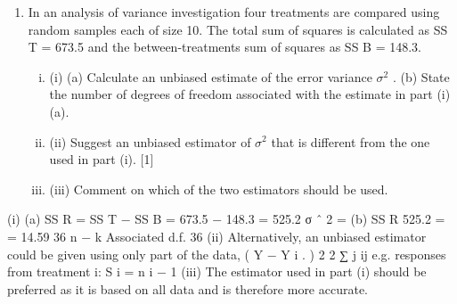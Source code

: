 \documentclass[a4paper,12pt]{article}
\begin{document}
\begin{enumerate}

\item In an analysis of variance investigation four treatments are compared using random
samples each of size 10. The total sum of squares is calculated as SS T = 673.5 and the
between-treatments sum of squares as SS B = 148.3.
\begin{enumerate}[(i)]
\item (i)
(a) Calculate an unbiased estimate of the error variance $\sigma^2$ .
(b) State the number of degrees of freedom associated with the estimate in
part (i)(a).

\item (ii) Suggest an unbiased estimator of $\sigma^2$ that is different from the one used in part
(i).
[1]
\item (iii) Comment on which of the two estimators should be used.
\end{enumerate}




\end{enumerate}
(i)
(a) SS R = SS T − SS B = 673.5 − 148.3 = 525.2
σ ˆ 2 =
(b)
SS R 525.2
=
= 14.59
36
n − k
Associated d.f. 36
(ii) Alternatively, an unbiased estimator could be given using only part of the data,
( Y − Y i . ) 2
2 ∑ j ij
e.g. responses from treatment i: S i =
n i − 1
(iii) The estimator used in part (i) should be preferred as it is based on all data and
is therefore more accurate.


\end{document}
